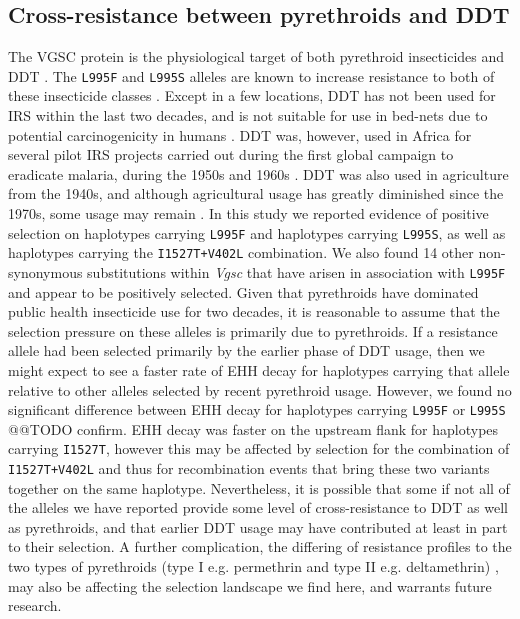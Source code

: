 \documentclass[a4paper,11pt,abstracton,hidelinks]{scrartcl}
\begin{document}
\subsection*{Cross-resistance between pyrethroids and DDT}


%
The VGSC protein is the physiological target of both pyrethroid insecticides and DDT \cite{Davies2007a}.
%
The \texttt{L995F} and \texttt{L995S} alleles are known to increase resistance to both of these insecticide classes \cite{Martinez-Torres1998,Ranson2000}.
%
Except in a few locations, DDT has not been used for IRS within the last two decades, and is not suitable for use in bed-nets due to potential carcinogenicity in humans \cite{Turusov2002}.
%
DDT was, however, used in Africa for several pilot IRS projects carried out during the first global campaign to eradicate malaria, during the 1950s and 1960s \cite{Davies2007b}.
%
DDT was also used in agriculture from the 1940s, and although agricultural usage has greatly diminished since the 1970s, some usage may remain \cite{Dunlap1981, Turusov2002}.
%
In this study we reported evidence of positive selection on haplotypes carrying \texttt{L995F} and haplotypes carrying \texttt{L995S}, as well as haplotypes carrying the \texttt{I1527T+V402L} combination.
%
We also found 14 other non-synonymous substitutions within \textit{Vgsc} that have arisen in association with \texttt{L995F} and appear to be positively selected.
%
Given that pyrethroids have dominated public health insecticide use for two decades, it is reasonable to assume that the selection pressure on these alleles is primarily due to pyrethroids.
%
If a resistance allele had been selected primarily by the earlier phase of DDT usage, then we might expect to see a faster rate of EHH decay for haplotypes carrying that allele relative to other alleles selected by recent pyrethroid usage.
%
However, we found no significant difference between EHH decay for haplotypes carrying \texttt{L995F} or \texttt{L995S} @@TODO confirm.
%
EHH decay was faster on the upstream flank for haplotypes carrying \texttt{I1527T}, however this may be affected by selection for the combination of \texttt{I1527T+V402L} and thus for recombination events that bring these two variants together on the same haplotype.
%
Nevertheless, it is possible that some if not all of the alleles we have reported provide some level of cross-resistance to DDT as well as pyrethroids, and that earlier DDT usage may have contributed at least in part to their selection.
%
A further complication, the differing of resistance profiles to the two types of pyrethroids (type I e.g. permethrin and type II e.g. deltamethrin) \cite{Hu2011}, may also be affecting the selection landscape we find here, and warrants future research. 
\end{document}
